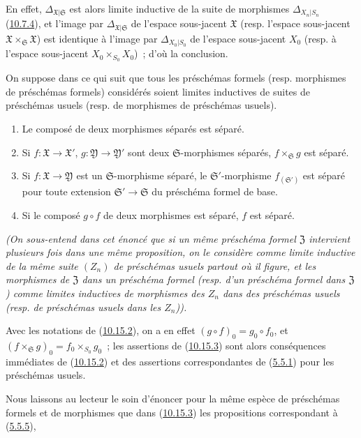 En effet, $\Delta_{\mathfrak{X}|\mathfrak{S}}$ est alors limite inductive de
la suite de morphismes $\Delta_{X_n|S_n}$
(\hyperref[I.10.7.4-fr]{10.7.4}), et l'image par
$\Delta_{\mathfrak{X}|\mathfrak{S}}$ de l'espace sous-jacent
$\mathfrak{X}$ (resp. l'espace sous-jacent
$\mathfrak{X}\times_{\mathfrak{S}}\mathfrak{X}$) est identique à l'image
par $\Delta_{X_0|S_0}$ de l'espace sous-jacent $X_0$ (resp. à l'espace
sous-jacent $X_0\times_{S_0}X_0$)~; d'où la conclusion.

\begin{proposition}[10.15.3]
\label{I.10.15.3-fr}
On suppose dans ce qui suit que tous les préschémas formels (resp.
morphismes de préschémas formels) considérés soient limites inductives de
suites de préschémas usuels (resp. de morphismes de préschémas usuels).
\begin{enumerate}
  \item[\rm{(i)}] Le composé de deux morphismes séparés est séparé.
  \item[\rm{(ii)}] Si $f:\mathfrak{X}\to\mathfrak{X}'$,
  $g:\mathfrak{Y}\to\mathfrak{Y}'$ sont deux $\mathfrak{S}$-morphismes
  séparés, $f\times_{\mathfrak{S}}g$ est séparé.
  \item[\rm{(iii)}] Si $f:\mathfrak{X}\to\mathfrak{Y}$ est un
  $\mathfrak{S}$-morphisme séparé, le $\mathfrak{S}'$-morphisme
  $f_{(\mathfrak{S}')}$ est séparé pour toute extension
  $\mathfrak{S}'\to\mathfrak{S}$ du préschéma formel de base.
  \item[\rm{(iv)}] Si le composé $g\circ f$ de deux morphismes est séparé,
  $f$ est séparé.
\end{enumerate}
\emph{(On sous-entend dans cet énoncé que si un même préschéma formel
$\mathfrak{Z}$ intervient plusieurs fois dans une même proposition, on le
considère comme limite inductive de la \emph{même} suite $(Z_n)$ de
préschémas usuels partout où il figure, et les morphismes de $\mathfrak{Z}$
dans un préschéma formel (resp. d'un préschéma formel dans $\mathfrak{Z}$)
comme limites inductives de morphismes des $Z_n$ dans des préschémas usuels
(resp. de préschémas usuels dans les $Z_n$)).}
\end{proposition}

Avec les notations de (\hyperref[I.10.15.2-fr]{10.15.2}), on a en effet
$(g\circ f)_0=g_0\circ f_0$, et
$(f\times_{\mathfrak{S}}g)_0=f_0\times_{S_0}g_0$~; les assertions de
(\hyperref[I.10.15.3-fr]{10.15.3}) sont alors conséquences immédiates de
(\hyperref[I.10.15.2-fr]{10.15.2}) et des assertions correspondantes de
(\hyperref[I.5.5.1-fr]{5.5.1}) pour les préschémas usuels.

Nous laissons au lecteur le soin d'énoncer pour la même espèce de
préschémas formels et de morphismes que dans
(\hyperref[I.10.15.3-fr]{10.15.3}) les propositions correspondant à
(\hyperref[I.5.5.5-fr]{5.5.5}),

